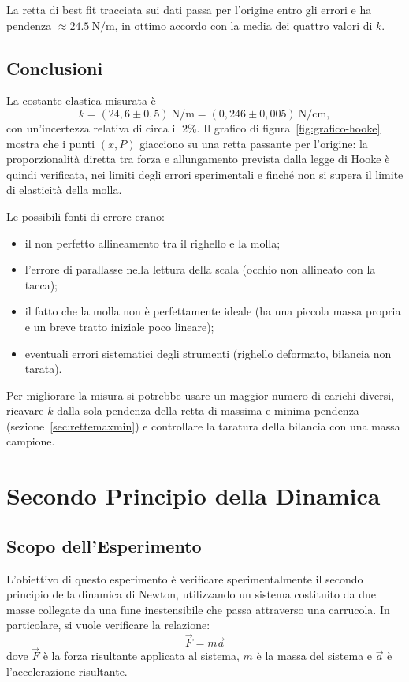 La retta di best fit tracciata sui dati passa per l'origine entro gli errori e ha pendenza $\approx\SI{24,5}{\newton\per\metre}$, in ottimo accordo con la media dei quattro valori di $k$.

\subsection{Conclusioni}
La costante elastica misurata è
\[ k = (24{,}6 \pm 0{,}5)\ \si{\newton\per\metre} = (0{,}246 \pm 0{,}005)\ \si{\newton\per\centi\metre}, \]
con un'incertezza relativa di circa il $2\%$. Il grafico di figura~\ref{fig:grafico-hooke} mostra che i punti $(x,P)$ giacciono su una retta passante per l'origine: la proporzionalità diretta tra forza e allungamento prevista dalla legge di Hooke è quindi verificata, nei limiti degli errori sperimentali e finché non si supera il limite di elasticità della molla.

Le possibili fonti di errore erano:
\begin{itemize}
    \item il non perfetto allineamento tra il righello e la molla;
    \item l'errore di parallasse nella lettura della scala (occhio non allineato con la tacca);
    \item il fatto che la molla non è perfettamente ideale (ha una piccola massa propria e un breve tratto iniziale poco lineare);
    \item eventuali errori sistematici degli strumenti (righello deformato, bilancia non tarata).
\end{itemize}

Per migliorare la misura si potrebbe usare un maggior numero di carichi diversi, ricavare $k$ dalla sola pendenza della retta di massima e minima pendenza (sezione~\ref{sec:rettemaxmin}) e controllare la taratura della bilancia con una massa campione.



\section{Secondo Principio della Dinamica}

\subsection{Scopo dell'Esperimento}
L'obiettivo di questo esperimento è verificare sperimentalmente il secondo principio della dinamica di Newton, utilizzando un sistema costituito da due masse collegate da una fune inestensibile che passa attraverso una carrucola. In particolare, si vuole verificare la relazione:
\begin{equation}
    \vec{F} = m\vec{a}
\end{equation}
dove $\vec{F}$ è la forza risultante applicata al sistema, $m$ è la massa del sistema e $\vec{a}$ è l'accelerazione risultante.

